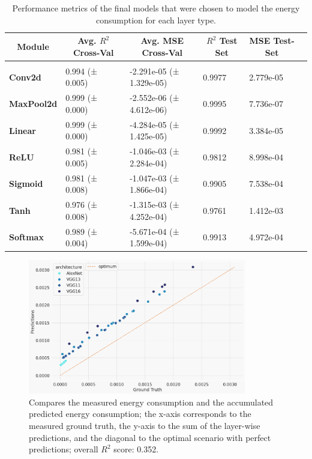 \begin{table}[t]
    \caption{Performance metrics of the final models that were chosen to model the energy consumption for each layer type.}
    \label{tab:layer-modles-performances}
    \begin{center}
        \begin{tabular}{l|lllll}
        \multicolumn{1}{c}{\bf Module} & \multicolumn{1}{c}{\bf Avg. $R^2$ Cross-Val}  & \multicolumn{1}{c}{\bf Avg. MSE Cross-Val} & \multicolumn{1}{c}{\bf $R^2$ Test Set} & \multicolumn{1}{c}{\bf MSE Test-Set}
        \\ \hline \\
\textbf{Conv2d}     & 0.994 (± 0.005) & -2.291e-05 (± 1.329e-05) & 0.9977 & 2.779e-05  \\
\textbf{MaxPool2d}  & 0.999 (± 0.000) & -2.552e-06 (± 4.612e-06) & 0.9995 & 7.736e-07  \\
\textbf{Linear}     & 0.999 (± 0.000) & -4.284e-05 (± 1.425e-05) & 0.9992 & 3.384e-05  \\
\textbf{ReLU}       & 0.981 (± 0.005) & -1.046e-03 (± 2.284e-04) & 0.9812 & 8.998e-04  \\
\textbf{Sigmoid}    & 0.981 (± 0.008) & -1.047e-03 (± 1.866e-04) & 0.9905 & 7.538e-04  \\
\textbf{Tanh}       & 0.976 (± 0.008) & -1.315e-03 (± 4.252e-04) & 0.9761 & 1.412e-03  \\
\textbf{Softmax}    & 0.989 (± 0.004) & -5.671e-04 (± 1.599e-04) & 0.9913 & 4.972e-04
        \end{tabular}
    \end{center}
\end{table}
\begin{figure}[h]
    \centering
    \includegraphics[width=0.85\textwidth]{resources/full-predictions.png}
    \caption{Compares the measured energy consumption and the accumulated predicted energy consumption; the x-axis corresponds to the measured ground truth, the y-axis to the sum of the layer-wise predictions, and the diagonal to the optimal scenario with perfect predictions; overall $R^2$ score: 0.352.}
    \label{fig:full-predictions}
\end{figure}
